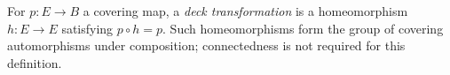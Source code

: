
For $p:E\to B$ a covering map, a \emph{deck transformation} is a homeomorphism $h:E\to E$ satisfying $p\circ h=p$. Such homeomorphisms form the group of covering automorphisms under composition; connectedness is not required for this definition.
